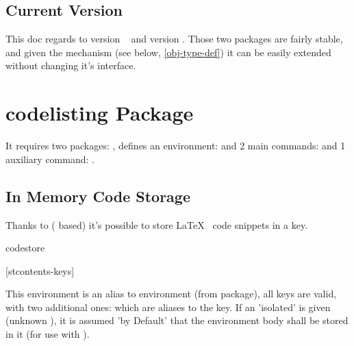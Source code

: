 \documentclass{article}
\begin{document}
\subsection{Current Version}
This doc regards to  version ~ and  version . Those two packages are fairly stable, and given the  mechanism (see below, \ref{obj-type-def}) it can be easily extended without changing it's interface.

\section{codelisting Package}

It requires two packages: ,  defines an environment:  and 
 2 main commands: \tsobj[code]{\tscode,\tsdemo} and 1 auxiliary command: \tsobj{\setcodekeys}.

\subsection{In Memory Code Storage}
Thanks to  ( based) it's possible to store \LaTeX~ code snippets in a  key.


\begin{codedescribe}[env,rulecolor=white]{codestore}
	\begin{codesyntax}
		\tsmacro{\begin{codestore}}[stcontents-keys]{}
    \tsmacro{\end{codestore}}{}
	\end{codesyntax}
This environment is an alias to  environment (from  package), all  keys are valid, with two additional ones:  which are aliases to the  key. If an 'isolated'  is given (unknown ), it is assumed 'by Default' that the environment body shall be stored in it (for use with \tsobj[code]{\tscode,\tsdemo}).
\end{codedescribe}
\end{document}
